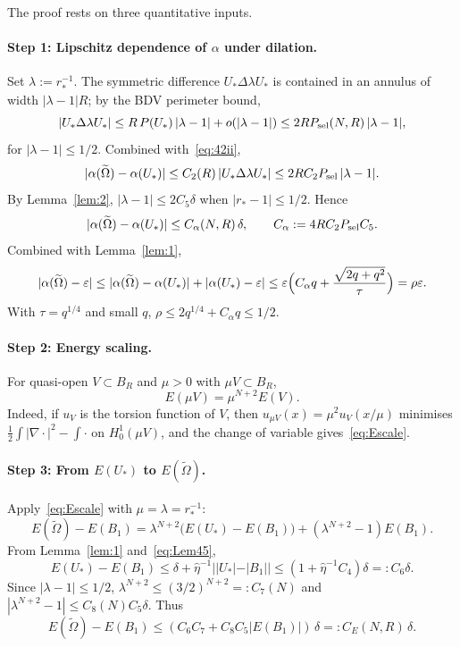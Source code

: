 \documentclass[11pt]{article}
\theoremstyle{definition}
\newcommand{\eps}{\varepsilon}
\newcommand{\wt}{\widetilde}
\newcommand{\Om}{\Omega}
\begin{document}
The proof rests on three quantitative inputs.

\paragraph{Step 1: Lipschitz dependence of $\alpha$ under dilation.}
Set $\lambda:=r_*^{-1}$. The symmetric difference $U_*\Delta\lambda U_*$ is
contained in an annulus of width $|\lambda-1|R$; by the BDV perimeter bound,
\begin{equation}\label{eq:dilL1}
|U_*\Delta\lambda U_*|\le R\,P(U_*)\,|\lambda-1|+o(|\lambda-1|)
\le 2RP_{\rm sel}(N,R)\,|\lambda-1|,
\end{equation}
for $|\lambda-1|\le1/2$. Combined with~\eqref{eq:42ii},
\[
|\alpha(\wt\Om)-\alpha(U_*)|\le C_2(R)\,|U_*\Delta\lambda U_*|
\le 2RC_2P_{\rm sel}\,|\lambda-1|.
\]
By Lemma~\ref{lem:2}, $|\lambda-1|\le 2C_5\delta$ when $|r_*-1|\le1/2$.
Hence
\[
|\alpha(\wt\Om)-\alpha(U_*)|\le C_\alpha(N,R)\,\delta,\qquad
C_\alpha:=4RC_2P_{\rm sel}C_5.
\]
Combined with Lemma~\ref{lem:1},
\begin{equation}\label{eq:alphatilde}
|\alpha(\wt\Om)-\eps|
\le|\alpha(\wt\Om)-\alpha(U_*)|+|\alpha(U_*)-\eps|
\le\eps\Bigl(C_\alpha q+\frac{\sqrt{2q+q^2}}{\tau}\Bigr)=\rho\eps.
\end{equation}
With $\tau=q^{1/4}$ and small $q$, $\rho\le2q^{1/4}+C_\alpha q\le1/2$.

\paragraph{Step 2: Energy scaling.}
For quasi-open $V\subset B_R$ and $\mu>0$ with $\mu V\subset B_R$,
\begin{equation}\label{eq:Escale}
E(\mu V)=\mu^{N+2}E(V).
\end{equation}
Indeed, if $u_V$ is the torsion function of $V$, then
$u_{\mu V}(x)=\mu^2 u_V(x/\mu)$ minimises
$\tfrac12\int|\nabla\cdot|^2-\int\cdot$ on $H^1_0(\mu V)$, and the change of
variable gives~\eqref{eq:Escale}.

\paragraph{Step 3: From $E(U_*)$ to $E(\wt\Om)$.}
Apply~\eqref{eq:Escale} with $\mu=\lambda=r_*^{-1}$:
\[
E(\wt\Om)-E(B_1)=\lambda^{N+2}\bigl(E(U_*)-E(B_1)\bigr)
+(\lambda^{N+2}-1)E(B_1).
\]
From Lemma~\ref{lem:1} and~\eqref{eq:Lem45},
\[
E(U_*)-E(B_1)\le\delta+\hat\eta^{-1}||U_*|-|B_1||\le(1+\hat\eta^{-1}C_4)\delta
=:C_6\delta.
\]
Since $|\lambda-1|\le1/2$, $\lambda^{N+2}\le(3/2)^{N+2}=:C_7(N)$ and
$|\lambda^{N+2}-1|\le C_8(N)C_5\delta$. Thus
\begin{equation}\label{eq:EtildeFinal}
E(\wt\Om)-E(B_1)\le(C_6C_7+C_8C_5|E(B_1)|)\,\delta=:C_E(N,R)\,\delta.
\end{equation}
\end{document}

